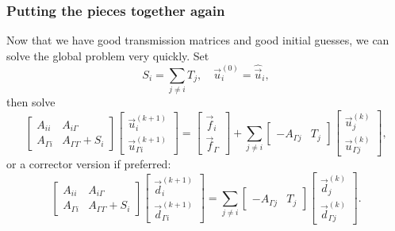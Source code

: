 \documentclass{beamer}
\begin{document}
\begin{frame}
\frametitle{Putting the pieces together again}

Now that we have good transmission matrices and good initial guesses, we can solve the global problem very quickly.
Set
\begin{equation*}
	S_i = \sum_{j \neq i} T_j, \quad \vec{u}_i^{(0)} = \hat{\vec{u}}_i,
\end{equation*}
then solve
\begin{equation*}
	\begin{bmatrix}
		A_{ii} & A_{i \Gamma} \\
		A_{\Gamma i} & A_{\Gamma \Gamma} + S_i
	\end{bmatrix}
	\begin{bmatrix} \vec{u}_i^{(k+1)} \\ \vec{u}_{\Gamma i}^{(k+1)} \end{bmatrix}
	=
	\begin{bmatrix} \vec{f}_i \\ \vec{f}_\Gamma \end{bmatrix}
	+ \sum_{j \neq i}
	\begin{bmatrix} ~ \\ -A_{\Gamma j} & T_j \end{bmatrix}
	\begin{bmatrix} \vec{u}_j^{(k)} \\ \vec{u}_{\Gamma j}^{(k)} \end{bmatrix},
\end{equation*}
or a corrector version if preferred:
\begin{equation*}
	\begin{bmatrix}
		A_{ii} & A_{i \Gamma} \\
		A_{\Gamma i} & A_{\Gamma \Gamma} + S_i
	\end{bmatrix}
	\begin{bmatrix} \vec{d}_i^{(k+1)} \\ \vec{d}_{\Gamma i}^{(k+1)} \end{bmatrix}
	= \sum_{j \neq i}
	\begin{bmatrix} ~ \\ -A_{\Gamma j} & T_j \end{bmatrix}
	\begin{bmatrix} \vec{d}_j^{(k)} \\ \vec{d}_{\Gamma j}^{(k)} \end{bmatrix}.
\end{equation*}
\end{frame}
\end{document}
